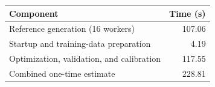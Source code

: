 \begin{tabular}{lr}
\toprule
Component & Time (s)\\
\midrule
Reference generation (16 workers) & 107.06 \\
Startup and training-data preparation & 4.19 \\
Optimization, validation, and calibration & 117.55 \\
\midrule
Combined one-time estimate & 228.81 \\
\bottomrule
\end{tabular}
